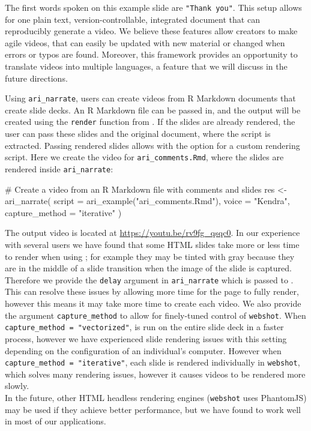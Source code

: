 The first words spoken on this example slide are \texttt{"Thank\ you"}.
This setup allows for one plain text, version-controllable, integrated
document that can reproducibly generate a video. We believe these
features allow creators to make agile videos, that can easily be updated
with new material or changed when errors or typos are found. Moreover,
this framework provides an opportunity to translate videos into multiple
languages, a feature that we will discuss in the future directions.

Using \texttt{ari\_narrate}, users can create videos from R Markdown
documents that create slide decks. An R Markdown file can be passed in,
and the output will be created using the \texttt{render} function from
 \citep{rmarkdown}. If the slides are already rendered,
the user can pass these slides and the original document, where the
script is extracted. Passing rendered slides allows with the option for
a custom rendering script. Here we create the video for
\texttt{ari\_comments.Rmd}, where the slides are rendered inside
\texttt{ari\_narrate}:

\begin{example}
# Create a video from an R Markdown file with comments and slides
res <- ari_narrate(
  script = ari_example("ari_comments.Rmd"),
  voice = "Kendra",
  capture_method = "iterative"
)
\end{example}

The output video is located at \url{https://youtu.be/rv9fg_qsqc0}. In
our experience with several users we have found that some HTML slides
take more or less time to render when using ; for example
they may be tinted with gray because they are in the middle of a slide
transition when the image of the slide is captured. Therefore we provide
the \texttt{delay} argument in \texttt{ari\_narrate} which is passed to
. This can resolve these issues by allowing more time for
the page to fully render, however this means it may take more time to
create each video. We also provide the argument \texttt{capture\_method}
to allow for finely-tuned control of \texttt{webshot}. When
\texttt{capture\_method\ =\ "vectorized"},  is run on the
entire slide deck in a faster process, however we have experienced slide
rendering issues with this setting depending on the configuration of an
individual's computer. However when
\texttt{capture\_method\ =\ "iterative"}, each slide is rendered
individually in \texttt{webshot}, which solves many rendering issues,
however it causes videos to be rendered more slowly.\\
In the future, other HTML headless rendering engines (\texttt{webshot}
uses PhantomJS) may be used if they achieve better performance, but we
have found  to work well in most of our applications.

